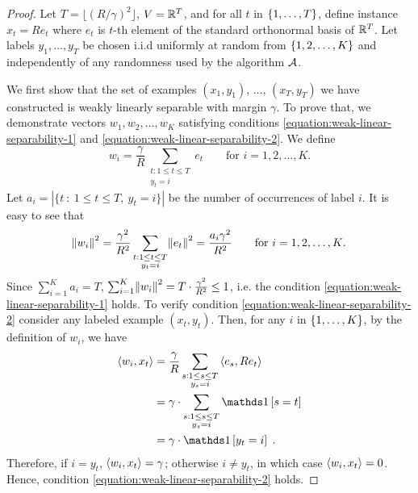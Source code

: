 \begin{proof}
Let $T = \lfloor (R/\gamma)^2 \rfloor$, $V = \mathbb{R}^T$, and for all $t$ in
$\cbr{1,\ldots,T}$, define instance $x_t = R e_t$ where $e_t$ is $t$-th element
of the standard orthonormal basis of $\mathbb{R}^T$.
Let labels $y_1, \ldots, y_T$ be chosen i.i.d uniformly at random from
$\cbr{1,2,\ldots,K}$ and independently of any randomness used by the algorithm
$\mathcal{A}$.




We first show that the set of examples $(x_1,y_1)$, $\ldots$,
$(x_T, y_T)$ we have constructed is weakly linearly separable
with margin $\gamma$. To prove that, we demonstrate vectors $w_1, w_2, \dots, w_K$
satisfying conditions \eqref{equation:weak-linear-separability-1} and
\eqref{equation:weak-linear-separability-2}. We define
$$
w_i = \frac{\gamma}{R} \sum_{\substack{t : 1 \le t \le T \\ y_t = i}} e_t \qquad \text{for $i=1,2,\dots,K$.}
$$
Let $a_i = |\{ t ~:~ 1 \le t \le T, \ y_t = i \}|$ be the number of occurrences of label $i$.
It is easy to see that
$$
\norm{w_i}^2 = \frac{\gamma^2}{R^2} \sum_{\substack{t : 1 \le t \le T \\ y_t = i}} \norm{e_t}^2 = \frac{a_i \gamma^2}{R^2} \qquad \text{for $i=1,2,\dots,K$.}
$$
Since $\sum_{i=1}^K a_i = T$,
$\sum_{i=1}^K \norm{w_i}^2 = T \cdot \frac{\gamma^2}{R^2} \leq 1$, i.e.
the condition
\eqref{equation:weak-linear-separability-1} holds. To verify condition
\eqref{equation:weak-linear-separability-2} consider any labeled example $(x_t,
y_t)$. Then, for any $i$ in $\cbr{1,\ldots,K}$, by the definition of $w_i$, we have
\begin{align*}
\ip{w_i}{x_t}
& = \frac{\gamma}{R} \sum_{\substack{s : 1 \le s \le T \\ y_s = i}} \ip{e_s}{R e_t} \\
& = \gamma \cdot \sum_{\substack{s : 1 \le s \le T \\ y_s = i}} \indicator{s = t} \\
& = \gamma \cdot \indicator{y_t = i}
\; .
\end{align*}
Therefore, if $i = y_t$, $\left\langle w_i, x_t \right\rangle = \gamma$;
otherwise $i \neq y_t$, in which case $\left\langle w_i, x_t \right\rangle = 0$.
Hence, condition \eqref{equation:weak-linear-separability-2} holds.


\end{proof}

